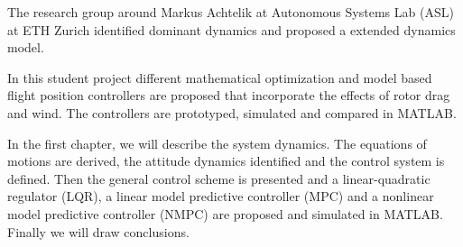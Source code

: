 The research group around Markus Achtelik at Autonomous Systems Lab (ASL) at ETH Zurich identified dominant dynamics and proposed a extended dynamics model. 

In this student project different mathematical optimization and model based flight position controllers are proposed that incorporate the effects of rotor drag and wind. The controllers are prototyped, simulated and compared in MATLAB.

In the first chapter, we will describe the system dynamics. The equations of motions are derived, the attitude dynamics identified and the control system is defined. Then the general control scheme is presented and a linear-quadratic regulator (LQR), a linear model predictive controller (MPC) and a nonlinear model predictive controller (NMPC) are proposed and simulated in MATLAB. Finally we will draw conclusions.
